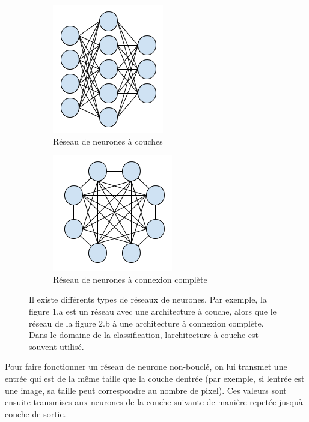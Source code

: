 \documentclass[11pt]{sdm}
\begin{document}
			\begin{figure}[!ht]
				\centering
				\begin{subfigure}{0.45\textwidth}
					\centering	
					\includegraphics[scale=0.7,natwidth=183,natheight=213]{figures/neuralNetworkLayers.png}
					\caption{R\'eseau de neurones \`a couches}
					\label{fig:nnl}
				\end{subfigure}
				\hspace*{\fill}
				\begin{subfigure}{0.45\textwidth}	
					\centering
					\includegraphics[scale=0.7,natwidth=198,natheight=192]{figures/neuralNetworkCompleteConnexion.png}
					\caption{R\'eseau de neurones \`a connexion compl\`ete}
					\label{fig:nnc}
				\end{subfigure}
				\caption{Il existe diff\'erents types de r\'eseaux de neurones. Par exemple, la figure 1.a est un r\'eseau avec une architecture \`a couche, alors que le r\'eseau de la figure 2.b \`a une architecture \`a connexion compl\`ete. Dans le domaine de la classification, l\textquotesingle architecture \`a couche est souvent utilis\'e.}
				\label{fig:neuralNetwork}
			\end{figure}
			
			Pour faire fonctionner un r\'eseau de neurone non-boucl\'e, on lui transmet une entr\'ee qui est de la m\^eme taille que la couche d\textquotesingle entr\'ee (par exemple, si l\textquotesingle entr\'ee est une image, sa taille peut correspondre au nombre de pixel). Ces valeurs sont ensuite transmises aux neurones de la couche suivante de mani\`ere repet\'ee jusqu\textquotesingle \`a couche de sortie.
\end{document}
